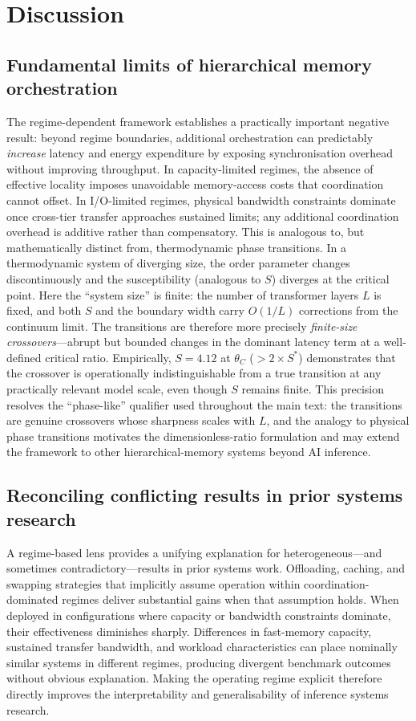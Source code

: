 \section{Discussion}
\label{sec:discussion}

\subsection{Fundamental limits of hierarchical memory orchestration}

The regime-dependent framework establishes a practically important negative
result: beyond regime boundaries, additional orchestration can predictably
\emph{increase} latency and energy expenditure by exposing synchronisation
overhead without improving throughput.
In capacity-limited regimes, the absence of effective locality imposes
unavoidable memory-access costs that coordination cannot offset.
In I/O-limited regimes, physical bandwidth constraints dominate once cross-tier
transfer approaches sustained limits; any additional coordination overhead is
additive rather than compensatory.
This is analogous to, but mathematically distinct from, thermodynamic phase
transitions.
In a thermodynamic system of diverging size, the order parameter changes
discontinuously and the susceptibility (analogous to $S$) diverges at the
critical point.
Here the ``system size'' is finite: the number of transformer layers $L$ is
fixed, and both $S$ and the boundary width carry $O(1/L)$ corrections from
the continuum limit.
The transitions are therefore more precisely \emph{finite-size crossovers}---abrupt
but bounded changes in the dominant latency term at a well-defined critical
ratio.
Empirically, $S = 4.12$ at $\theta_C$ ($> 2\times S^*$) demonstrates that
the crossover is operationally indistinguishable from a true transition at any
practically relevant model scale, even though $S$ remains finite.
This precision resolves the ``phase-like'' qualifier used throughout the main
text: the transitions are genuine crossovers whose sharpness scales with $L$,
and the analogy to physical phase transitions motivates the dimensionless-ratio
formulation and may extend the framework to other hierarchical-memory systems
beyond AI inference.

\subsection{Reconciling conflicting results in prior systems research}

A regime-based lens provides a unifying explanation for heterogeneous---and
sometimes contradictory---results in prior systems work.
Offloading, caching, and swapping strategies that implicitly assume operation
within coordination-dominated regimes deliver substantial gains when that
assumption holds.
When deployed in configurations where capacity or bandwidth constraints dominate,
their effectiveness diminishes sharply.
Differences in fast-memory capacity, sustained transfer bandwidth, and workload
characteristics can place nominally similar systems in different regimes,
producing divergent benchmark outcomes without obvious explanation.
Making the operating regime explicit therefore directly improves the
interpretability and generalisability of inference systems research.

